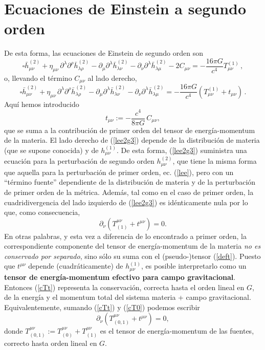 \section{Ecuaciones de Einstein a segundo orden}
De esta forma, las ecuaciones de Einstein de segundo orden son
\begin{equation}\label{lee2g2}
\square \bar{h}^{(2)}_{\mu\nu}
+\eta_{\mu\nu}\, \partial^\lambda\partial^\rho\bar{h}^{(2)}_{\lambda\rho}-
\partial_\mu\partial^\lambda\bar{h}^{(2)}_{\lambda\nu}
- \partial_\nu\partial^\lambda \bar{h}^{(2)}_{\lambda\mu} -2C_{\mu\nu}=
-\frac{16\pi G}{c^4}T_{\mu\nu}^{(1)} \, ,
\end{equation}
o, llevando el término $C_{\mu\nu}$ al lado derecho,
\begin{equation}\label{lee2g3}
\boxed{\square \bar{h}^{(2)}_{\mu\nu}
+\eta_{\mu\nu}\, \partial^\lambda\partial^\rho\bar{h}^{(2)}_{\lambda\rho}-
\partial_\mu\partial^\lambda\bar{h}^{(2)}_{\lambda\nu}
- \partial_\nu\partial^\lambda \bar{h}^{(2)}_{\lambda\mu} =
-\frac{16\pi G}{c^4}\left(T_{\mu\nu}^{(1)}+t_{\mu\nu} \right)\, .}
\end{equation}
Aquí hemos introducido
\begin{equation}
t_{\mu\nu}:=-\frac{c^4}{8\pi G}\,C_{\mu\nu}, \label{deft}
\end{equation}
que se suma a la contribución de primer orden del tensor de energía-momentum de la materia. El lado derecho de (\ref{lee2g3}) depende de la distribución de materia (que se supone conocida) y de $h^{(1)}_{\mu\nu}$. De esta forma, (\ref{lee2g3}) suministra una ecuación para la perturbación de segundo orden $h^{(2)}_{\mu\nu}$, que tiene la misma forma que aquella para la perturbación de primer orden, ec. (\ref{lee}), pero con un ``término fuente'' dependiente de la distribución de materia y de la perturbación de primer orden de la métrica. Además, tal como en el caso de primer orden, la cuadridivergencia del lado izquierdo de (\ref{lee2g3}) es idénticamente nula por lo que, como consecuencia,
\begin{equation}
\partial_\nu\left(T^{\mu\nu}_{(1)}+t^{\mu\nu} \right)=0. \label{cTt}
\end{equation}
En otras palabras, y esta vez a diferencia de lo encontrado a primer orden, la correspondiente componente del tensor de energía-momentum de la materia \textit{no es conservado por separado}, sino sólo su suma con el (pseudo-)tensor (\ref{deft}). Puesto que $t^{\mu\nu}$ depende (cuadráticamente) de $h^{(1)}_{\mu\nu}$, es posible interpretarlo como un \textbf{tensor de energía-momentum efectivo para campo gravitacional}. Entonces (\ref{cTt}) representa la conservación, correcta hasta el orden lineal en $G$, de la energía y el momentum total del sistema materia + campo gravitacional. Equivalentemente, sumando (\ref{cTt}) y (\ref{cT0}) podemos escribir
\begin{equation}
\boxed{\partial_\nu\left(T^{\mu\nu}_{(0,1)}+t^{\mu\nu} \right)=0,} \label{cT01t}
\end{equation}
donde $T^{\mu\nu}_{(0,1)}:=T^{\mu\nu}_{(0)}+T^{\mu\nu}_{(1)}$ es el tensor de energía-momentum de las fuentes, correcto hasta orden lineal en $G$.

